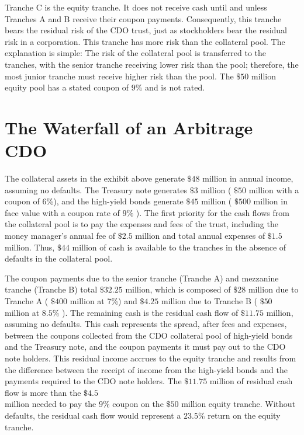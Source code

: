 \documentclass[11pt]{article}
\begin{document}
Tranche $\mathrm{C}$ is the equity tranche. It does not receive cash until and unless Tranches A and B receive their coupon payments. Consequently, this tranche bears the residual risk of the CDO trust, just as stockholders bear the residual risk in a corporation. This tranche has more risk than the collateral pool. The explanation is simple: The risk of the collateral pool is transferred to the tranches, with the senior tranche receiving lower risk than the pool; therefore, the most junior tranche must receive higher risk than the pool. The $\$ 50$ million equity pool has a stated coupon of $9 \%$ and is not rated.

\section*{The Waterfall of an Arbitrage CDO}
The collateral assets in the exhibit above generate $\$ 48$ million in annual income, assuming no defaults. The Treasury note generates $\$ 3$ million ( $\$ 50$ million with a coupon of 6\%), and the high-yield bonds generate $\$ 45$ million ( $\$ 500$ million in face value with a coupon rate of $9 \%$ ). The first priority for the cash flows from the collateral pool is to pay the expenses and fees of the trust, including the money manager's annual fee of $\$ 2.5$ million and total annual expenses of $\$ 1.5$ million. Thus, $\$ 44$ million of cash is available to the tranches in the absence of defaults in the collateral pool.

The coupon payments due to the senior tranche (Tranche A) and mezzanine tranche (Tranche B) total $\$ 32.25$ million, which is composed of $\$ 28$ million due to Tranche A ( $\$ 400$ million at 7\%) and $\$ 4.25$ million due to Tranche B ( $\$ 50$ million at $8.5 \%$ ). The remaining cash is the residual cash flow of $\$ 11.75$ million, assuming no defaults. This cash represents the spread, after fees and expenses, between the coupons collected from the CDO collateral pool of high-yield bonds and the Treasury note, and the coupon payments it must pay out to the CDO note holders. This residual income accrues to the equity tranche and results from the difference between the receipt of income from the high-yield bonds and the payments required to the CDO note holders. The $\$ 11.75$ million of residual cash flow is more than the $\$ 4.5$\\
million needed to pay the $9 \%$ coupon on the $\$ 50$ million equity tranche. Without defaults, the residual cash flow would represent a $23.5 \%$ return on the equity tranche.
\end{document}
